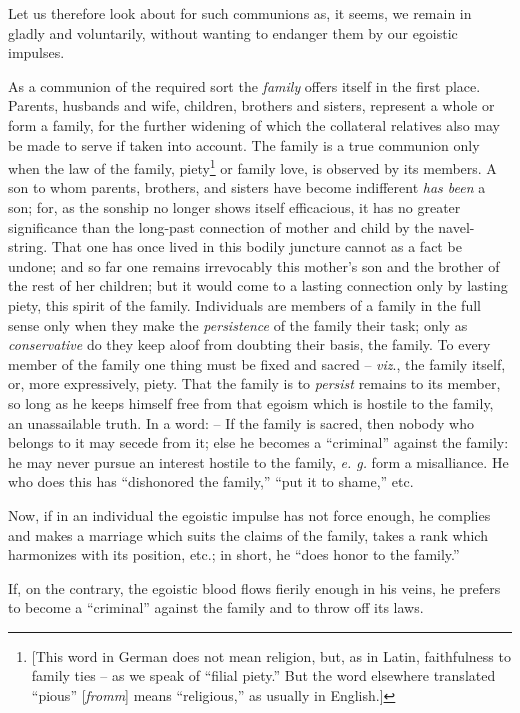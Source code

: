 \documentclass[12pt,a4paper]{book}
\begin{document}
Let us therefore look about for such communions as, it seems, we remain in 
gladly and voluntarily, without wanting to endanger them by our egoistic 
impulses.

As a communion of the required sort the \textit{family} offers itself in the 
first place. Parents, husbands and wife, children, brothers and sisters, 
represent a whole or form a family, for the further widening of which the 
collateral relatives also may be made to serve if taken into account. The 
family is a true communion only when the law of the family, 
piety\footnote{[This word in German does not mean religion, but, as in Latin, 
faithfulness to family ties -- as we speak of ``filial piety.'' But the word 
elsewhere translated ``pious'' [\textit{fromm}] means ``religious,'' as 
usually in English.]} or family love, is observed by its members. A son to 
whom parents, brothers, and sisters have become indifferent \textit{has been} 
a son; for, as the sonship no longer shows itself efficacious, it has no 
greater significance than the long-past connection of mother and child by the 
navel-string. That one has once lived in this bodily juncture cannot as a fact 
be undone; and so far one remains irrevocably this mother's son and the 
brother of the rest of her children; but it would come to a lasting connection 
only by lasting piety, this spirit of the family. Individuals are members of a 
family in the full sense only when they make the \textit{persistence} of the 
family their task; only as \textit{conservative} do they keep aloof from 
doubting their basis, the family. To every member of the family one thing must 
be fixed and sacred -- \textit{viz}., the family itself, or, more 
expressively, piety. That the family is to \textit{persist} remains to its 
member, so long as he keeps himself free from that egoism which is hostile to 
the family, an unassailable truth. In a word: -- If the family is sacred, then 
nobody who belongs to it may secede from it; else he becomes a ``criminal'' 
against the family: he may never pursue an interest hostile to the family, 
\textit{e. g.} form a misalliance. He who does this has ``dishonored the 
family,'' ``put it to shame,'' etc.

Now, if in an individual the egoistic impulse has not force enough, he 
complies and makes a marriage which suits the claims of the family, takes a 
rank which harmonizes with its position, etc.; in short, he ``does honor to 
the family.''

If, on the contrary, the egoistic blood flows fierily enough in his veins, he 
prefers to become a ``criminal'' against the family and to throw off its 
laws.
\end{document}
